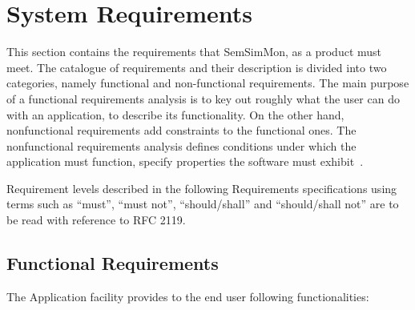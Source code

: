 \section{System Requirements}
\label{sec:SystemRequirements}

This section contains the requirements that SemSimMon, as a product must meet. The catalogue of requirements and their description is divided into two categories, namely functional and non-functional requirements. The main purpose of a functional requirements analysis is to key out roughly what the user can do with an application, to describe its functionality. On the other hand, nonfunctional requirements add constraints to the functional ones. The nonfunctional requirements analysis defines conditions under which the application must function, specify properties the software must exhibit~\cite{Windle:SoftReq}.

Requirement levels described in the following Requirements specifications using terms such as ``must'', ``must not'', ``should/shall'' and ``should/shall not'' are to be read with reference to RFC 2119\cite{rfc:2119}.

\subsection{Functional Requirements}
\label{subsec:FunctionalRequirements}

The Application facility provides to the end user following functionalities: 

